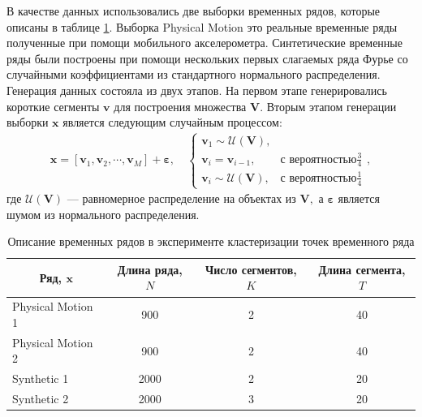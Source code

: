 В качестве данных использовались две выборки временных рядов, которые описаны в таблице \ref{table_1}. 
Выборка Physical Motion это реальные временные ряды полученные при помощи мобильного акселерометра. 
Синтетические временные ряды были построены при помощи нескольких первых слагаемых ряда Фурье со случайными коэффициентами из стандартного нормального распределения. 
Генерация данных состояла из двух этапов. 
На первом этапе генерировались короткие сегменты $\textbf{v}$ для построения множества $\mathbf{V}$. 
Вторым этапом генерации выборки $\textbf{x}$ является следующим случайным процессом:
\[
\label{eq:exp:1}
\begin{aligned}
\textbf{x} = [\textbf{v}_{1}, \textbf{v}_{2}, \cdots, \textbf{v}_{M}] + \bm{\varepsilon}, \quad \begin{cases}
    \textbf{v}_{1} \sim \mathcal{U}\left(\mathbf{V}\right),\\
    \textbf{v}_{i} = \textbf{v}_{i - 1}, & \text{с вероятностью} \frac{3}{4}\\
    \textbf{v}_{i} \sim \mathcal{U}\left(\mathbf{V}\right), & \text{с вероятностью} \frac{1}{4}
\end{cases},
\end{aligned}
\]
где $\mathcal{U}\left(\mathbf{V}\right)$ --- равномерное распределение на объектах из $\mathbf{V},$ а $\bm{\varepsilon}$ является шумом из нормального распределения.

\begin{table}[h!t]
\begin{center}
\caption{Описание временных рядов в эксперименте кластеризации точек временного ряда}
\label{table_1}
\begin{tabular}{|c|c|c|c|}
\hline
	Ряд, $\textbf{x}$ &Длина ряда, $N$& Число сегментов, $K$&Длина сегмента, $T$\\
	\hline
	\multicolumn{1}{|l|}{Physical Motion 1}
	& 900& 2& 40\\
	\hline
	\multicolumn{1}{|l|}{Physical Motion 2}
	& 900& 2& 40\\
	\hline
	\multicolumn{1}{|l|}{Synthetic 1}
	& 2000& 2& 20\\
	\hline
	\multicolumn{1}{|l|}{Synthetic 2}
	& 2000& 3& 20\\
\hline

\end{tabular}
\end{center}
\end{table}


